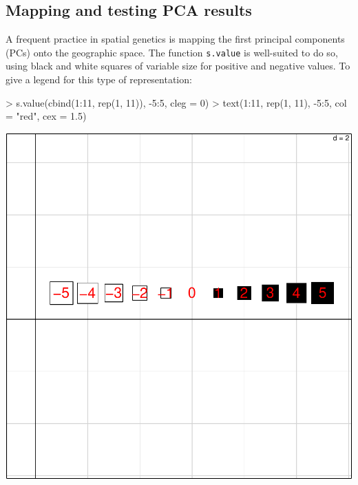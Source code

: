 \documentclass{article}
\begin{document}
\subsection{Mapping and testing PCA results}
A frequent practice in spatial genetics is mapping the first principal components (PCs) onto the geographic space.
The function \texttt{s.value} is well-suited to do so, using black and
white squares of variable size for positive and negative values.
To give a legend for this type of representation:
\begin{Schunk}
\begin{Sinput}
> s.value(cbind(1:11, rep(1, 11)), -5:5, cleg = 0)
> text(1:11, rep(1, 11), -5:5, col = "red", cex = 1.5)
\end{Sinput}
\end{Schunk}
\includegraphics{figs/spca-svaluedem}
\end{document}
